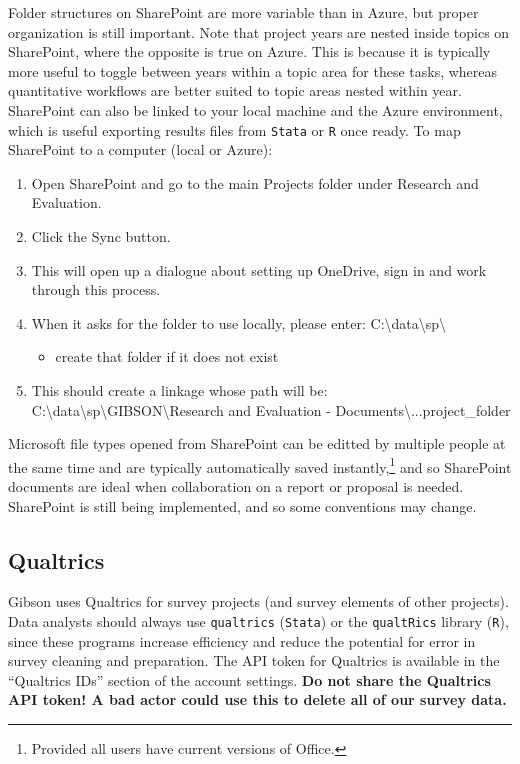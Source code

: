 {Folder structures on SharePoint are more variable than in Azure, but proper organization is still important. Note that project years are nested inside topics on SharePoint, where the opposite is true on Azure. This is because it is typically more useful to toggle between years within a topic area for these tasks, whereas quantitative workflows are better suited to topic areas nested within year. SharePoint can also be linked to your local machine and the Azure environment, which is useful exporting results files from \texttt{Stata} or \texttt{R} once ready. To map SharePoint to a computer (local or Azure):

\begin{enumerate}
	\item Open SharePoint and go to the main Projects folder under Research and Evaluation.
	\item Click the Sync button.
	\item This will open up a dialogue about setting up OneDrive, sign in and work through this process.
	\item When it asks for the folder to use locally, please enter: C:\textbackslash{}data\textbackslash{}sp\textbackslash{}
	\begin{itemize}
		\item create that folder if it does not exist
	\end{itemize}
	\item This should create a linkage whose path will be: C:\textbackslash{}data\textbackslash{}sp\textbackslash{}GIBSON\textbackslash{}Research and Evaluation - Documents\textbackslash{}...project\_folder
\end{enumerate}

Microsoft file types opened from SharePoint can be editted by multiple people at the same time and are typically automatically saved instantly,\footnote{Provided all users have current versions of Office.} and so SharePoint documents are ideal when collaboration on a report or proposal is needed. SharePoint is still being implemented, and so some conventions may change. \\


\subsection{Qualtrics}
Gibson uses Qualtrics for survey projects (and survey elements of other projects). Data analysts should always use \texttt{qualtrics} (\texttt{Stata}) or the \texttt{qualtRics} library (\texttt{R}), since these programs increase efficiency and reduce the potential for error in survey cleaning and preparation. The API token for Qualtrics is available in the ``Qualtrics IDs'' section of the account settings. {\textbf{Do not share the Qualtrics API token! A bad actor could use this to delete all of our survey data.}}

}
